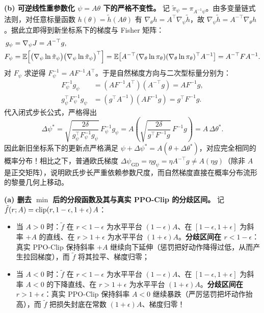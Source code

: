 \textbf{(b) 可逆线性重参数化 $\psi = A\theta$ 下的严格不变性。} 记 $\tilde{\pi}_\psi = \pi_{A^{-1}\psi}$。由多变量链式法则，对任意标量函数 $h(\theta) = \tilde{h}(A\theta)$ 有 $\nabla_\theta h = A^\top \nabla_\psi \tilde{h}$，故 $\nabla_\psi \tilde{h} = A^{-\top} \nabla_\theta h$。据此立即得到新坐标系下的梯度与 Fisher 矩阵：
\begin{align*}
  g_\psi &= \nabla_\psi J = A^{-\top} g, \\
  F_\psi &= \mathbb{E}\!\left[\big(\nabla_\psi \ln \tilde{\pi}_\psi\big)\big(\nabla_\psi \ln \tilde{\pi}_\psi\big)^\top\right]
          = \mathbb{E}\!\left[A^{-\top}(\nabla_\theta \ln \pi_\theta)(\nabla_\theta \ln \pi_\theta)^\top A^{-1}\right]
          = A^{-\top} F A^{-1}.
\end{align*}
对 $F_\psi$ 求逆得 $F_\psi^{-1} = A F^{-1} A^\top$。于是自然梯度方向与二次型标量分别为：
\begin{align*}
  F_\psi^{-1} g_\psi &= (A F^{-1} A^\top)(A^{-\top} g) = A F^{-1} g, \\
  g_\psi^\top F_\psi^{-1} g_\psi &= (g^\top A^{-1})(A F^{-1} g) = g^\top F^{-1} g.
\end{align*}
代入闭式步长公式，严格得出
\[
  \Delta\psi^* = \sqrt{\frac{2\delta}{g_\psi^\top F_\psi^{-1} g_\psi}}\,F_\psi^{-1} g_\psi
  = A \left(\sqrt{\frac{2\delta}{g^\top F^{-1} g}}\,F^{-1} g\right) = A\,\Delta\theta^*.
\]
因此新旧坐标系下的更新点严格满足 $\psi + \Delta\psi^* = A(\theta + \Delta\theta^*)$，对应完全相同的概率分布！相比之下，普通欧氏梯度 $\Delta\psi_{\mathrm{GD}} = \eta g_\psi = \eta A^{-\top} g \neq A(\eta g)$（除非 $A$ 是正交矩阵），说明欧氏步长严重依赖参数尺度，而自然梯度直接在概率分布流形的黎曼几何上移动。


\textbf{(a) 删去 $\min$ 后的分段函数及其与真实 PPO-Clip 的分歧区间。} 记 $\tilde{f}(r; A) = \operatorname{clip}(r, 1-\epsilon, 1+\epsilon)\,A$：
\begin{itemize}
  \item 当 $A > 0$ 时：$\tilde{f}$ 在 $r < 1-\epsilon$ 为水平平台 $(1-\epsilon)A$、在 $[1-\epsilon, 1+\epsilon]$ 为斜率 $+A$ 的直线、在 $r > 1+\epsilon$ 为水平平台 $(1+\epsilon)A$。\textbf{分歧区间在 $r < 1-\epsilon$}：真实 PPO-Clip 保持斜率 $+A$ 继续向下延伸（惩罚把好动作降得过低，从而产生拉回梯度），而 $\tilde{f}$ 将其拉平、梯度归零；
  \item 当 $A < 0$ 时：$\tilde{f}$ 在 $r < 1-\epsilon$ 为水平平台 $(1-\epsilon)A$、在 $[1-\epsilon, 1+\epsilon]$ 为斜率 $A < 0$ 的下降直线、在 $r > 1+\epsilon$ 为水平平台 $(1+\epsilon)A$。\textbf{分歧区间在 $r > 1+\epsilon$}：真实 PPO-Clip 保持斜率 $A < 0$ 继续暴跌（严厉惩罚把坏动作抬高），而 $\tilde{f}$ 把损失封底在常数 $(1+\epsilon)A$、梯度归零！
\end{itemize}

